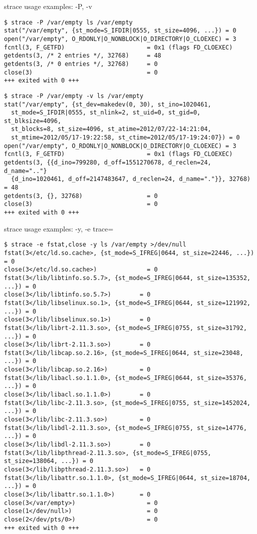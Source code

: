 \begin{frame}[fragile]{strace usage examples: -P, -v}
\scriptsize
\begin{verbatim}
$ strace -P /var/empty ls /var/empty
stat("/var/empty", {st_mode=S_IFDIR|0555, st_size=4096, ...}) = 0
open("/var/empty", O_RDONLY|O_NONBLOCK|O_DIRECTORY|O_CLOEXEC) = 3
fcntl(3, F_GETFD)                       = 0x1 (flags FD_CLOEXEC)
getdents(3, /* 2 entries */, 32768)     = 48
getdents(3, /* 0 entries */, 32768)     = 0
close(3)                                = 0
+++ exited with 0 +++
\end{verbatim}

\begin{verbatim}
$ strace -P /var/empty -v ls /var/empty
stat("/var/empty", {st_dev=makedev(0, 30), st_ino=1020461,
  st_mode=S_IFDIR|0555, st_nlink=2, st_uid=0, st_gid=0, st_blksize=4096,
  st_blocks=8, st_size=4096, st_atime=2012/07/22-14:21:04,
  st_mtime=2012/05/17-19:22:58, st_ctime=2012/05/17-19:24:07}) = 0
open("/var/empty", O_RDONLY|O_NONBLOCK|O_DIRECTORY|O_CLOEXEC) = 3
fcntl(3, F_GETFD)                       = 0x1 (flags FD_CLOEXEC)
getdents(3, {{d_ino=799280, d_off=1551270678, d_reclen=24, d_name=".."}
  {d_ino=1020461, d_off=2147483647, d_reclen=24, d_name="."}}, 32768) = 48
getdents(3, {}, 32768)                  = 0
close(3)                                = 0
+++ exited with 0 +++
\end{verbatim}
\end{frame}

\begin{frame}[fragile]{strace usage examples: -y, -e trace=}
\scriptsize
\begin{verbatim}
$ strace -e fstat,close -y ls /var/empty >/dev/null
fstat(3</etc/ld.so.cache>, {st_mode=S_IFREG|0644, st_size=22446, ...}) = 0
close(3</etc/ld.so.cache>)              = 0
fstat(3</lib/libtinfo.so.5.7>, {st_mode=S_IFREG|0644, st_size=135352, ...}) = 0
close(3</lib/libtinfo.so.5.7>)        = 0
fstat(3</lib/libselinux.so.1>, {st_mode=S_IFREG|0644, st_size=121992, ...}) = 0
close(3</lib/libselinux.so.1>)        = 0
fstat(3</lib/librt-2.11.3.so>, {st_mode=S_IFREG|0755, st_size=31792, ...}) = 0
close(3</lib/librt-2.11.3.so>)        = 0
fstat(3</lib/libcap.so.2.16>, {st_mode=S_IFREG|0644, st_size=23048, ...}) = 0
close(3</lib/libcap.so.2.16>)         = 0
fstat(3</lib/libacl.so.1.1.0>, {st_mode=S_IFREG|0644, st_size=35376, ...}) = 0
close(3</lib/libacl.so.1.1.0>)        = 0
fstat(3</lib/libc-2.11.3.so>, {st_mode=S_IFREG|0755, st_size=1452024, ...}) = 0
close(3</lib/libc-2.11.3.so>)         = 0
fstat(3</lib/libdl-2.11.3.so>, {st_mode=S_IFREG|0755, st_size=14776, ...}) = 0
close(3</lib/libdl-2.11.3.so>)        = 0
fstat(3</lib/libpthread-2.11.3.so>, {st_mode=S_IFREG|0755, st_size=138064, ...}) = 0
close(3</lib/libpthread-2.11.3.so>)   = 0
fstat(3</lib/libattr.so.1.1.0>, {st_mode=S_IFREG|0644, st_size=18704, ...}) = 0
close(3</lib/libattr.so.1.1.0>)       = 0
close(3</var/empty>)                    = 0
close(1</dev/null>)                     = 0
close(2</dev/pts/0>)                    = 0
+++ exited with 0 +++
\end{verbatim}
\end{frame}

